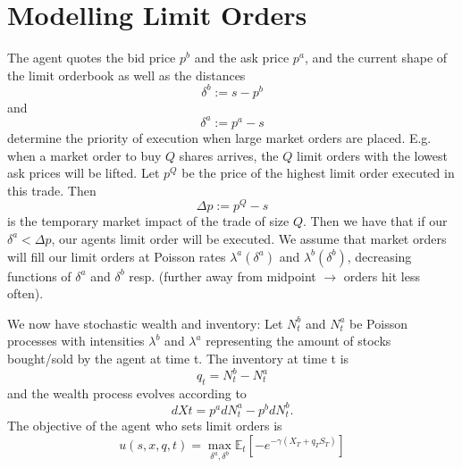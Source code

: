 \section{Modelling Limit Orders}
The agent quotes the bid price $p^b$ and the ask price $p^a$, and the current shape of the limit orderbook as well as the distances 
$$\delta^b:=s-p^b$$
and 
$$\delta^a:=p^a-s$$ 
determine the priority of execution when large market orders are placed. 
E.g. when a market order to buy $Q$ shares arrives, the $Q$ limit orders with the lowest ask prices will be lifted. 
Let $p^Q$ be the price of the highest limit order executed in this trade. Then 
$$\Delta p:=p^Q-s$$ 
is the temporary market impact of the trade of size $Q.$ 
Then we have that if our $\delta^a < \Delta p$, our agents limit order will be executed. We assume that market orders will fill our limit orders at Poisson rates $\lambda^a(\delta^a)$ and $\lambda^b(\delta^b)$, decreasing functions of $\delta^a$ and $\delta^b$ resp. 
(further away from midpoint $\rightarrow$ orders hit less often).

We now have stochastic wealth and inventory: Let $N^b_t$ and $N^a_t$ be Poisson processes with intensities $\lambda^b$ and $\lambda^a$ representing the amount of stocks bought/sold by the agent at time t. The inventory at time t is 
$$q_t=N^b_t-N^a_t$$ and the wealth process evolves according to
$$dXt=p^adN^a_t-p^bdN^b_t.$$
The objective of the agent who sets limit orders is 
$$u(s,x,q,t)=\max\limits_{\delta^a,\delta^b}\mathbb{E}_t\left[-e^{-\gamma(X_T+q_TS_T)}\right]$$

